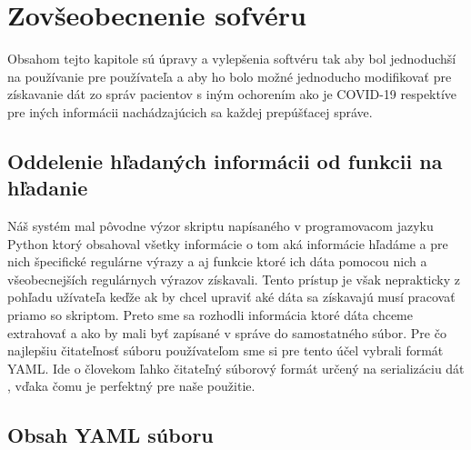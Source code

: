 \chapter{Zovšeobecnenie sofvéru}

Obsahom tejto kapitole sú úpravy a vylepšenia softvéru tak aby bol jednoduchší na používanie pre používateľa a aby ho bolo možné jednoducho modifikovať pre získavanie dát zo správ pacientov s iným ochorením ako je COVID-19 respektíve pre iných informácii nachádzajúcich sa každej prepúšťacej správe.  

\section{Oddelenie hľadaných informácii od funkcii na hľadanie}

Náš systém mal pôvodne výzor skriptu napísaného v programovacom jazyku Python ktorý obsahoval všetky informácie o tom aká informácie hľadáme a pre nich špecifické regulárne výrazy a aj funkcie ktoré ich dáta pomocou nich a všeobecnejších regulárnych výrazov získavali. Tento prístup je však neprakticky z pohľadu užívateľa keďže ak by chcel upraviť aké dáta sa získavajú musí pracovať priamo so skriptom. Preto sme sa rozhodli informácia ktoré dáta chceme extrahovať a ako by mali byť zapísané v správe do samostatného súbor. Pre čo najlepšiu čitateľnosť súboru používateľom sme si pre tento účel vybrali formát YAML. Ide o človekom ľahko čitateľný súborový formát určený na serializáciu dát \cite{YAML}, vďaka čomu je perfektný pre naše použitie. 

\section{Obsah YAML súboru}

